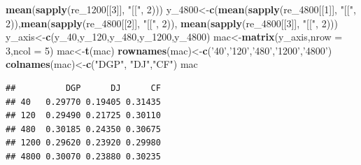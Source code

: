 \documentclass[
]{article}
\newenvironment{Shaded}{\begin{snugshade}}{\end{snugshade}}
\newcommand{\DataTypeTok}[1]{\textcolor[rgb]{0.13,0.29,0.53}{#1}}
\newcommand{\DecValTok}[1]{\textcolor[rgb]{0.00,0.00,0.81}{#1}}
\newcommand{\KeywordTok}[1]{\textcolor[rgb]{0.13,0.29,0.53}{\textbf{#1}}}
\newcommand{\NormalTok}[1]{#1}
\newcommand{\StringTok}[1]{\textcolor[rgb]{0.31,0.60,0.02}{#1}}
\begin{document}
\begin{Shaded}
\begin{Highlighting}[]
        \KeywordTok{mean}\NormalTok{(}\KeywordTok{sapply}\NormalTok{(re_}\DecValTok{1200}\NormalTok{[[}\DecValTok{3}\NormalTok{]], }\StringTok{"[["}\NormalTok{, }\DecValTok{2}\NormalTok{)))}
\NormalTok{y_}\DecValTok{4800}\NormalTok{<-}\KeywordTok{c}\NormalTok{(}\KeywordTok{mean}\NormalTok{(}\KeywordTok{sapply}\NormalTok{(re_}\DecValTok{4800}\NormalTok{[[}\DecValTok{1}\NormalTok{]], }\StringTok{"[["}\NormalTok{, }\DecValTok{2}\NormalTok{)),}\KeywordTok{mean}\NormalTok{(}\KeywordTok{sapply}\NormalTok{(re_}\DecValTok{4800}\NormalTok{[[}\DecValTok{2}\NormalTok{]], }\StringTok{"[["}\NormalTok{, }\DecValTok{2}\NormalTok{)),}
        \KeywordTok{mean}\NormalTok{(}\KeywordTok{sapply}\NormalTok{(re_}\DecValTok{4800}\NormalTok{[[}\DecValTok{3}\NormalTok{]], }\StringTok{"[["}\NormalTok{, }\DecValTok{2}\NormalTok{)))}
\NormalTok{y_axis<-}\KeywordTok{c}\NormalTok{(y_}\DecValTok{40}\NormalTok{,y_}\DecValTok{120}\NormalTok{,y_}\DecValTok{480}\NormalTok{,y_}\DecValTok{1200}\NormalTok{,y_}\DecValTok{4800}\NormalTok{)}
\NormalTok{mac<-}\KeywordTok{matrix}\NormalTok{(y_axis,}\DataTypeTok{nrow =} \DecValTok{3}\NormalTok{,}\DataTypeTok{ncol =} \DecValTok{5}\NormalTok{)}
\NormalTok{mac<-}\KeywordTok{t}\NormalTok{(mac)}
\KeywordTok{rownames}\NormalTok{(mac)<-}\KeywordTok{c}\NormalTok{(}\StringTok{'40'}\NormalTok{,}\StringTok{'120'}\NormalTok{,}\StringTok{'480'}\NormalTok{,}\StringTok{'1200'}\NormalTok{,}\StringTok{'4800'}\NormalTok{)}
\KeywordTok{colnames}\NormalTok{(mac)<-}\KeywordTok{c}\NormalTok{(}\StringTok{"DGP"}\NormalTok{, }\StringTok{"DJ"}\NormalTok{,}\StringTok{"CF"}\NormalTok{)}
\NormalTok{mac}
\end{Highlighting}
\end{Shaded}

\begin{verbatim}
##          DGP      DJ      CF
## 40   0.29770 0.19405 0.31435
## 120  0.29490 0.21725 0.30110
## 480  0.30185 0.24350 0.30675
## 1200 0.29620 0.23920 0.29980
## 4800 0.30070 0.23880 0.30235
\end{verbatim}
\end{document}
